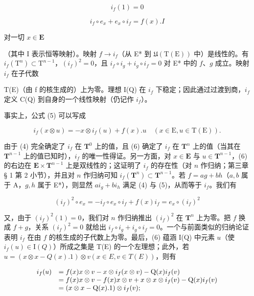\[
i _ {f} (1) = 0\tag{5}
\]

\[
i _ {f} \circ e _ {x} + e _ {x} \circ i _ {f} = f (x). I
\]

对一切 \(x \in \mathbf{E}\)

（其中 I 表示恒等映射）。映射 \(f \to i_f\)（从 E* 到 \(\mathfrak{U}(\mathrm{T}(\mathrm{E}))\) 中）是线性的。有 \(i_f(\mathrm{T}^n) \subset \mathrm{T}^{n-1}\)，\((i_f)^2 = 0\)，且 \(i_f \circ i_g + i_g \circ i_f = 0\) 对 E* 中的 \(f\)、\(g\) 成立。映射 \(i_f\) 在子代数

T(E)（由 f 的核生成的）上为零。理想 I(Q) 在 \(i_{f}\) 下稳定；因此通过过渡到商，\(i_{f}\) 定义 C(Q) 到自身的一个线性映射（仍记作 \(i_{f}\)）。

  事实上，公式 (5) 可以写成

\[
i _ {f} (x \otimes u) = - x \otimes i _ {f} (u) + f (x). u \quad (x \in \mathrm{E}, u \in \mathrm{T(E)}).\tag{6}
\]

  由于 (4) 完全确定了 \(i_{f}\) 在 \(\mathbf{T}^{0}\) 上的值，且 (6) 确定了 \(i_{f}\) 在 \(\mathbf{T}^{n}\) 上的值（当其在 \(\mathbf{T}^{n-1}\) 上的值已知时），\(i_{f}\) 的唯一性得证。另一方面，对 \(x\in\mathbf{E}\) 与 \(u\in\mathbf{T}^{n-1}\)，(6) 的右边在 \(\mathbf{E}\times\mathbf{T}^{n-1}\) 上是双线性的；这证明了 \(i_{f}\) 的存在性（对 \(n\) 作归纳；第三章 § 1 第 2 小节），并且对 \(n\) 作归纳可知 \(i_{f}(\mathbf{T}^{n})\subset\mathbf{T}^{n-1}\)。若 \(f=ag+bh\)（\(a,b\) 属于 A，\(g,h\) 属于 E*），则显然 \(ai_{g}+bi_{h}\) 满足 (4) 与 (5)，从而等于 \(i_{f}\)。我们有

\[
(i _ {f}) ^ {2} \circ e _ {x} = - i _ {f} \circ e _ {x} \circ i _ {f} + f (x) i _ {f} = e _ {x} \circ (i _ {f}) ^ {2}
\]

  又，由于 \((i_f)^2(1) = 0\)，我们对 \(n\) 作归纳推出 \((i_f)^2\) 在 \(\mathbf{T}^n\) 上为零。把 \(f\) 换成 \(f + g\)，关系 \((i_f)^2 = 0\) 就给出 \(i_f \circ i_g + i_g \circ i_f = 0\)。一个与前面类似的归纳论证表明 \(i_f\) 在由 \(f\) 的核生成的子代数上为零。最后，(6) 蕴涵 I(Q) 中元素 \(u\)（使 \(i_f(u) \in \mathrm{I}(Q)\)）所成之集是 T(E) 的一个左理想；此外，若 \(u = (x \otimes x - Q(x).1) \otimes v (x \in E, v \in T(E))\)，则有

\[
\begin{array}{r l} i _ {f} (u) & = f (x) x \otimes v - x \otimes i _ {f} (x \otimes v) - \mathrm{Q} (x) i _ {f} (v) \\ & = f (x) x \otimes v - f (x) x \otimes v + x \otimes x \otimes i _ {f} (v) - \mathrm{Q} (x) i _ {f} (v) \\ & = (x \otimes x - \mathrm{Q} (x). 1) \otimes i _ {f} (v); \end{array}
\]

